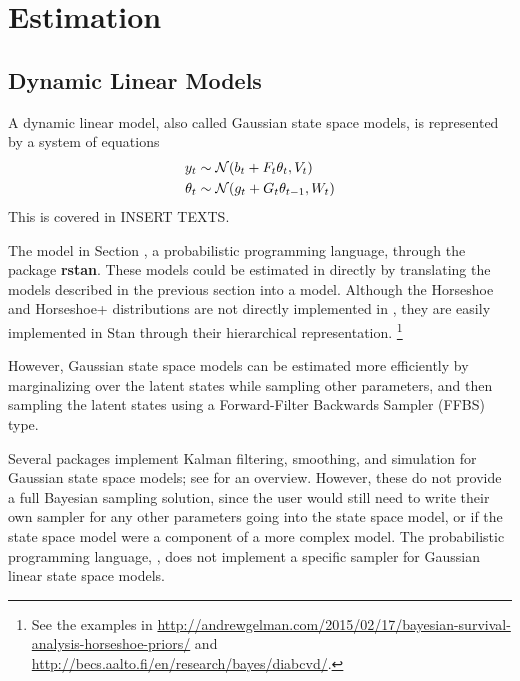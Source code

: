 \section{Estimation}
\label{dlm:sec:estimation}



\subsection{Dynamic Linear Models}
\label{dlm:sec:dynam-line-models}

A dynamic linear model, also called Gaussian state space models, is represented by a system of equations
\begin{equation}
  \label{dlm:eq:4}
  \begin{aligned}[t]
  y_{t} &\sim \mathcal{N}\mathopen{}\left(b_{t} + F_{t} \theta_{t}, V_{t}\right)\mathclose{} \\
  \theta_{t} &\sim \mathcal{N}\mathopen{}\left(g_{t} + G_{t} \theta_{t - 1}, W_{t}\right)\mathclose{} 
  \end{aligned}
\end{equation}
This is covered in INSERT TEXTS.

The model in Section \Stan{}, a probabilistic programming language, through the \RLang{} package \textbf{rstan}.
These models could be estimated in \Stan{} directly by translating the models described in the previous section into a \Stan{} model.
Although the Horseshoe and Horseshoe+ distributions are not directly implemented in \Stan{}, they are easily implemented in Stan through their hierarchical representation.%
\footnote{See the examples in \url{http://andrewgelman.com/2015/02/17/bayesian-survival-analysis-horseshoe-priors/} and \url{http://becs.aalto.fi/en/research/bayes/diabcvd/}.}

However, Gaussian state space models can be estimated more efficiently by marginalizing over the latent states while sampling other parameters, and then sampling the latent states using a Forward-Filter Backwards Sampler (FFBS) type.

Several \RLang{} packages implement Kalman filtering, smoothing, and simulation for Gaussian state space models; see \textcite{Tusell2011} for an overview.
However, these do not provide a full Bayesian sampling solution, since the user would still need to write their own sampler for any other parameters going into the state space model, or if the state space model were a component of a more complex model.
The  probabilistic programming language, , does not implement a specific sampler for Gaussian linear state space models.


